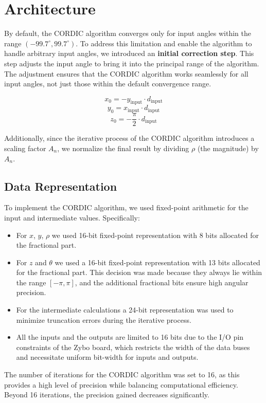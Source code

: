 \chapter{Architecture}


By default, the CORDIC algorithm converges only for input angles within the range \( (-99.7^\circ, 99.7^\circ) \).
To address this limitation and enable the algorithm to handle arbitrary input angles, we introduced an \textbf{initial correction step}. This step adjusts the input angle to bring it into the principal range of the algorithm. The adjustment ensures that the CORDIC algorithm works seamlessly for all input angles, not just those within the default convergence range.

\[
    x_0 = -y_{\text{input}} \cdot d_{\text{input}}
\]
\[
    y_0 =  x_{\text{input}} \cdot d_{\text{input}}
\]
\[
    z_0 = -\frac{\pi}{2} \cdot d_{\text{input}}
\]

Additionally, since the iterative process of the CORDIC algorithm introduces a scaling factor \( A_n \), we normalize the final result by dividing \( \rho \) (the magnitude) by \( A_n \).

\section{Data Representation}

To implement the CORDIC algorithm, we used fixed-point arithmetic for the input and intermediate values. Specifically:

\begin{itemize}
    \item For \( x \), \( y \), \( \rho \) we used 16-bit fixed-point representation with 8 bits allocated for the fractional part.
    \item For \( z \) and \( \theta \) we used a 16-bit fixed-point representation with 13 bits allocated for the fractional part. This decision was made because they always lie within the range \( [-\pi, \pi] \), and the additional fractional bits ensure high angular precision.
    \item For the intermediate calculations a 24-bit representation was used to minimize truncation errors during the iterative process.
    \item All the inputs and the outputs are limited to 16 bits due to the I/O pin constraints of the Zybo board, which restricts the width of the data buses and necessitate uniform bit-width for inputs and outputs.
\end{itemize}

The number of iterations for the CORDIC algorithm was set to 16, as this provides a high level of precision while balancing computational efficiency. Beyond 16 iterations, the precision gained decreases significantly.